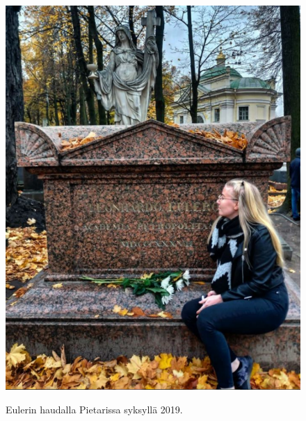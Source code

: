\documentclass[a4paper,11pt]{article}
\begin{document}
\begin{figure}
\centering
\includegraphics[scale=0.6]{eulerinhauta.png}
\label{hauta}
\caption{Eulerin haudalla Pietarissa syksyllä 2019.}
\end{figure}
 
\newpage

\nocite{*}
\printbibliography
 

 
\end{document}
